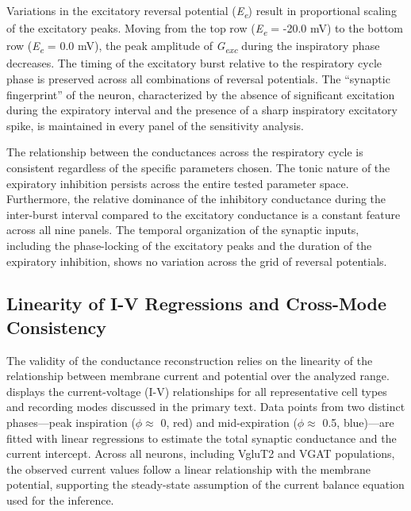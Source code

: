 Variations in the excitatory reversal potential (\emph{E\textsubscript{e}}) result in proportional scaling of the excitatory peaks. Moving from the top row (\emph{E\textsubscript{e}} = -20.0 mV) to the bottom row (\emph{E\textsubscript{e}} = 0.0 mV), the peak amplitude of \emph{G\textsubscript{exc}} during the inspiratory phase decreases. The timing of the excitatory burst relative to the respiratory cycle phase is preserved across all combinations of reversal potentials. The ``synaptic fingerprint'' of the neuron, characterized by the absence of significant excitation during the expiratory interval and the presence of a sharp inspiratory excitatory spike, is maintained in every panel of the sensitivity analysis.

The relationship between the conductances across the respiratory cycle is consistent regardless of the specific parameters chosen. The tonic nature of the expiratory inhibition persists across the entire tested parameter space. Furthermore, the relative dominance of the inhibitory conductance during the inter-burst interval compared to the excitatory conductance is a constant feature across all nine panels. The temporal organization of the synaptic inputs, including the phase-locking of the excitatory peaks and the duration of the expiratory inhibition, shows no variation across the grid of reversal potentials.

\subsection{Linearity of I-V Regressions and Cross-Mode Consistency}

The validity of the conductance reconstruction relies on the linearity of the relationship between membrane current and potential over the analyzed range.  displays the current-voltage (I-V) relationships for all representative cell types and recording modes discussed in the primary text. Data points from two distinct phases---peak inspiration (\(\phi \approx\) 0, red) and mid-expiration (\(\phi \approx\) 0.5, blue)---are fitted with linear regressions to estimate the total synaptic conductance and the current intercept. Across all neurons, including VgluT2 and VGAT populations, the observed current values follow a linear relationship with the membrane potential, supporting the steady-state assumption of the current balance equation used for the inference.


